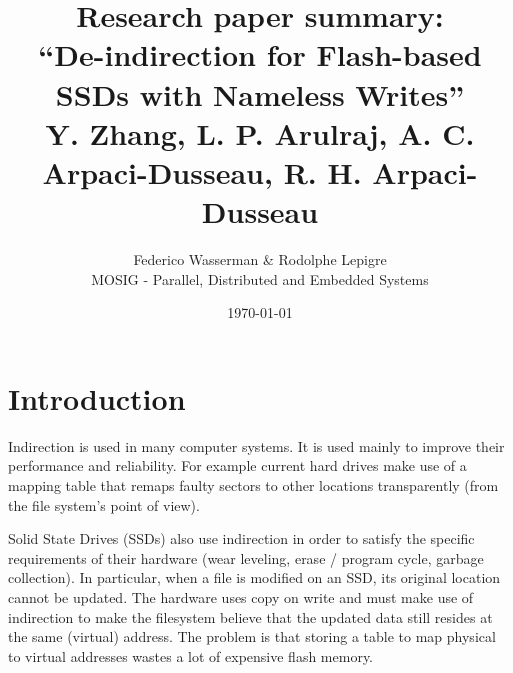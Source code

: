 \documentclass[twocolumn,a4paper,10pt]{article}
\begin{document}
\title{Research paper summary:\\
       ``De-indirection for Flash-based SSDs with Nameless Writes''\\
       \small{Y. Zhang, L. P. Arulraj, A. C. Arpaci-Dusseau, R. H. Arpaci-Dusseau}}
\author{Federico Wasserman \& Rodolphe Lepigre\\
        MOSIG - Parallel, Distributed and Embedded Systems}
\date{\today}
\maketitle

%
%
%

\section*{Introduction}
Indirection is used in many computer systems. It is used mainly to improve
their performance and reliability. For example current hard drives make use of
a mapping table that remaps faulty sectors to other locations transparently
(from the file system's point of view).

Solid State Drives (SSDs) also use indirection in order to satisfy the
specific requirements of their hardware (wear leveling, erase / program
cycle, garbage collection). In particular, when a file is modified on an SSD,
its original location cannot be updated. The hardware uses copy on write and
must make use of indirection to make the filesystem believe that the updated
data still resides at the same (virtual) address. The problem is that storing
a table to map physical to virtual addresses wastes a lot of expensive flash
memory.
\end{document}
